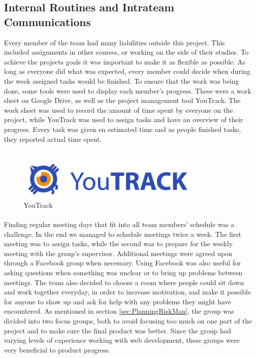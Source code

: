 \subsection{Internal Routines and Intrateam Communications}
\label{subsec:PlanningQualityRoutines}
Every member of the team had many liabilities outside this project. This included assignments in other courses, or working on the side of their studies. To achieve the projects goals it was important to make it as flexible as possible. As long as everyone did what was expected, every member could decide when during the week assigned tasks would be finished. To ensure that the work was being done, some tools were used to display each member's progress. These were a work sheet on Google Drive, as well as the project management tool YouTrack. The work sheet was used to record the amount of time spent by everyone on the project, while YouTrack was used to assign tasks and have an overview of their progress. Every task was given en estimated time and as people finished tasks, they reported actual time spent.\\%
\\%
\begin{figure}[ht!]
\centering
\includegraphics[width=90mm]{./Planning/img/YouTrack_logo}
\caption{YouTrack \label{fig:PlanningQualityRoutinesYouTrack}}
\end{figure}


\paragraph{} Finding regular meeting days that fit into all team members' schedule was a challenge. In the end we managed to schedule meetings twice a week. The first meeting was to assign tasks, while the second was to prepare for the weekly meeting with the group's supervisor. Additional meetings were agreed upon through a Facebook group when necessary. Using Facebook was also useful for asking questions when something was unclear or to bring up problems between meetings. The team also decided to choose a room where people could sit down and work together everyday, in order to increase motivation, and make it possible for anyone to show up and ask for help with any problems they might have encountered. As mentioned in section \ref{sec:PlanningRiskMan}, the group was divided into two focus groups, both to avoid focusing too much on one part of the project and to make sure the final product was better. Since the group had varying levels of experience working with web development, these groups were very beneficial to product progress.

